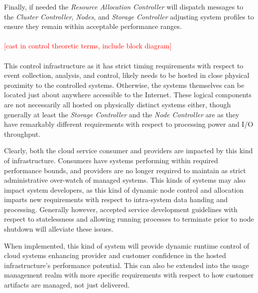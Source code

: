 \documentclass[times, 10pt,twocolumn]{article}
\begin{document}
Finally, if needed the \textit{Resource Allocation Controller} will dispatch messages to the \textit{Cluster Controller}, \textit{Nodes}, and \textit{Storage Controller} adjusting system profiles to ensure they remain within acceptable performance ranges.
\\
\\
\textcolor{red}{[cast in control theoretic terms, include block diagram]}
\\
\\
This control infrastructure as it has strict timing requirements with respect to event collection, analysis, and control, likely needs to be hosted in close physical proximity to the controlled systems.  Otherwise, the systems themselves can be located just about anywhere accessible to the Internet.  These logical components are not necessarily all hosted on physically distinct systems either, though generally at least the \textit{Storage Controller} and the \textit{Node Controller} are as they have remarkably different requirements with respect to processing power and I/O throughput.

Clearly, both the cloud service consumer and providers are impacted by this kind of infrastructure.  Consumers have systems performing within required performance bounds, and providers are no longer required to maintain as strict administrative over-watch of managed systems.  This kinds of systems may also impact system developers, as this kind of dynamic node control and allocation imparts new requirements with respect to intra-system data handing and processing.  Generally however, accepted service development guidelines with respect to statelessness and allowing running processes to terminate prior to node shutdown will alleviate these issues.

When implemented, this kind of system will provide dynamic runtime control of cloud systems enhancing provider and customer confidence in the hosted infrastructure's performance potential.  This can also be extended into the usage management realm with more specific requirements with respect to how customer artifacts are managed, not just delivered.
\end{document}
